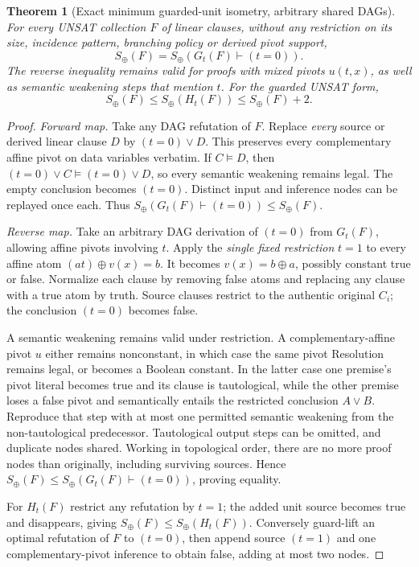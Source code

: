 \documentclass[11pt]{article}
\newtheorem{theorem}{Theorem}
\begin{document}
\begin{theorem}[Exact minimum guarded-unit isometry, arbitrary shared DAGs]
For every UNSAT collection $F$ of linear clauses, without any restriction on its size, incidence pattern, branching policy or derived pivot support,
\[
\boxed{S_\oplus(F)=S_\oplus(G_t(F)\vdash(t=0)).}
\]
The reverse inequality remains valid for proofs with mixed pivots $u(t,x)$, as well as semantic weakening steps that mention $t$. For the guarded UNSAT form,
\[
\boxed{S_\oplus(F)\le S_\oplus(H_t(F))\le S_\oplus(F)+2.}
\]
\end{theorem}
\begin{proof}
\textit{Forward map.} Take any DAG refutation of $F$. Replace \emph{every} source or derived linear clause $D$ by $(t=0)\vee D$. This preserves every complementary affine pivot on data variables verbatim. If $C\models D$, then $(t=0)\vee C\models(t=0)\vee D$, so every semantic weakening remains legal. The empty conclusion becomes $(t=0)$. Distinct input and inference nodes can be replayed once each. Thus $S_\oplus(G_t(F)\vdash(t=0))\le S_\oplus(F)$.

\textit{Reverse map.} Take an arbitrary DAG derivation of $(t=0)$ from $G_t(F)$, allowing affine pivots involving $t$. Apply the \emph{single fixed restriction} $t=1$ to every affine atom $(a t)\oplus v(x)=b$. It becomes $v(x)=b\oplus a$, possibly constant true or false. Normalize each clause by removing false atoms and replacing any clause with a true atom by truth. Source clauses restrict to the authentic original $C_i$; the conclusion $(t=0)$ becomes false.

A semantic weakening remains valid under restriction. A complementary-affine pivot $u$ either remains nonconstant, in which case the same pivot Resolution remains legal, or becomes a Boolean constant. In the latter case one premise's pivot literal becomes true and its clause is tautological, while the other premise loses a false pivot and semantically entails the restricted conclusion $A\vee B$. Reproduce that step with at most one permitted semantic weakening from the non-tautological predecessor. Tautological output steps can be omitted, and duplicate nodes shared. Working in topological order, there are no more proof nodes than originally, including surviving sources. Hence $S_\oplus(F)\le S_\oplus(G_t(F)\vdash(t=0))$, proving equality.

For $H_t(F)$ restrict any refutation by $t=1$; the added unit source becomes true and disappears, giving $S_\oplus(F)\le S_\oplus(H_t(F))$. Conversely guard-lift an optimal refutation of $F$ to $(t=0)$, then append source $(t=1)$ and one complementary-pivot inference to obtain false, adding at most two nodes. \end{proof}
\end{document}
